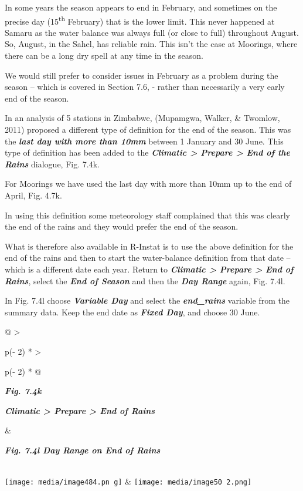 \documentclass[
  letterpaper,
  DIV=11,
  numbers=noendperiod]{scrreprt}
\begin{document}
In some years the season appears to end in February, and sometimes on
the precise day (15\textsuperscript{th} February) that is the lower
limit. This never happened at Samaru as the water balance was always
full (or close to full) throughout August. So, August, in the Sahel, has
reliable rain. This isn't the case at Moorings, where there can be a
long dry spell at any time in the season.

We would still prefer to consider issues in February as a problem during
the season -- which is covered in Section 7.6, - rather than necessarily
a very early end of the season.

In an analysis of 5 stations in Zimbabwe, (Mupamgwa, Walker, \& Twomlow,
2011) proposed a different type of definition for the end of the season.
This was the \textbf{\emph{last day with more than 10mm}} between 1
January and 30 June. This type of definition has been added to the
\textbf{\emph{Climatic \textgreater{} Prepare \textgreater{} End of the
Rains}} dialogue, Fig. 7.4k.

For Moorings we have used the last day with more than 10mm up to the end
of April, Fig. 4.7k.

In using this definition some meteorology staff complained that this was
clearly the end of the rains and they would prefer the end of the
season.

What is therefore also available in R-Instat is to use the above
definition for the end of the rains and then to start the water-balance
definition from that date -- which is a different date each year. Return
to \textbf{\emph{Climatic \textgreater{} Prepare \textgreater{} End of
Rains}}, select the \textbf{\emph{End of Season}} and then the
\textbf{\emph{Day Range}} again, Fig. 7.4l.

In Fig. 7.4l choose \textbf{\emph{Variable Day}} and select the
\textbf{\emph{end\_rains}} variable from the summary data. Keep the end
date as \textbf{\emph{Fixed Day}}, and choose 30 June.

\begin{longtable}[]{@{}
  >{\raggedright\arraybackslash}p{(\columnwidth - 2\tabcolsep) * }
  >{\raggedright\arraybackslash}p{(\columnwidth - 2\tabcolsep) * }@{}}
\toprule\noalign{}
\begin{minipage}[b]{\linewidth}\raggedright
\textbf{\emph{Fig. 7.4k}}

\textbf{\emph{Climatic \textgreater{} Prepare \textgreater{} End of
Rains}}
\end{minipage} & \begin{minipage}[b]{\linewidth}\raggedright
\textbf{\emph{Fig. 7.4l Day Range on End of Rains}}
\end{minipage} \\
\midrule\noalign{}
\endhead
\bottomrule\noalign{}
\endlastfoot
\texttt{[image: media/image484.pn g]}
&
\texttt{[image: media/image50 2.png]} \\
\end{longtable}
\end{document}
